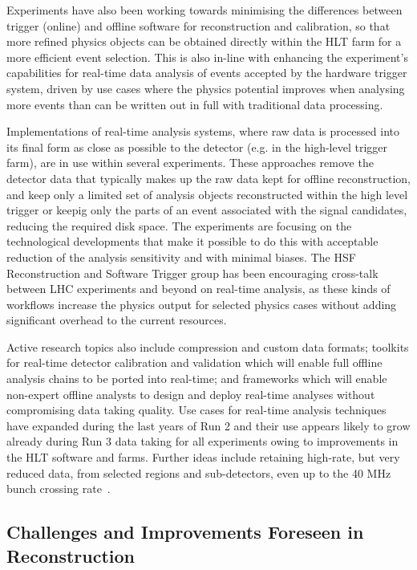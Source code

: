 Experiments have also been working towards minimising the differences
between trigger (online) and offline software for reconstruction and
calibration, so that more refined physics objects can be obtained
directly within the HLT farm for a more efficient event selection. This
is also in-line with enhancing the experiment's capabilities for
real-time data analysis of events accepted by the hardware trigger
system, driven by use cases where the physics potential improves when
analysing more events than can be written out in full with
traditional data processing.

Implementations of real-time analysis systems, where raw data is
processed into its final form as close as possible to the detector (e.g.
in the high-level trigger farm), are in use within several experiments.
These approaches remove the detector data that typically makes up the
raw data kept for offline reconstruction, and keep only a limited
set of analysis objects reconstructed within the high level trigger or
keepig only the parts of an event associated with the
signal candidates, reducing the required disk space.
The experiments are focusing on the technological developments that make it
possible to do this with acceptable reduction of the analysis
sensitivity and with minimal biases. The HSF Reconstruction and Software Trigger
group has been encouraging cross-talk between LHC experiments and beyond
on real-time analysis, as these kinds of workflows increase the physics output for selected
physics cases without adding significant overhead to the current
resources.

Active research topics also include compression and custom data formats;
toolkits for real-time detector calibration and validation which will
enable full offline analysis chains to be ported into real-time; and
frameworks which will enable non-expert offline analysts to design and
deploy real-time analyses without compromising data taking quality.
Use cases for real-time analysis techniques have expanded during the
last years of Run 2 and their use appears likely to
grow already during Run 3 data taking for all experiments owing to
improvements in the HLT software and farms. %
Further ideas include retaining high-rate, but very reduced data, from selected regions and
sub-detectors, even up to the 40 MHz bunch crossing rate~\cite{hannes_sakulin_2019_3598769}.

\hypertarget{challenges-and-improvements-foreseen-in-event-reconstruction}{%
\subsection{Challenges and Improvements Foreseen in
Reconstruction}\label{challenges-and-improvements-foreseen-in-event-reconstruction}}

